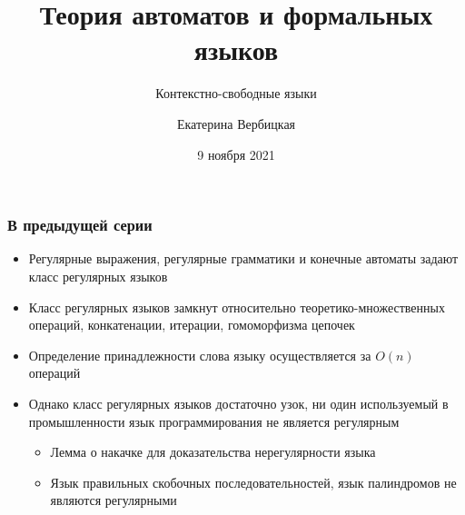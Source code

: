\documentclass{beamer}
\title[]{Теория автоматов и формальных языков}
\subtitle[]{Контекстно-свободные языки}
\institute[]{
Санкт-Петербургский государственный электротехнический университет <<ЛЭТИ>>\\
}
\author[]{Екатерина Вербицкая}
\date{9 ноября 2021}
\begin{document}
{
  \begin{frame}
    \titlepage
  \end{frame}
}


\begin{frame}[fragile]
  \transwipe[direction=90]
  \frametitle{В предыдущей серии}
  \begin{itemize}
    \item Регулярные выражения, регулярные грамматики и конечные автоматы задают класс регулярных языков
    \item Класс регулярных языков замкнут относительно теоретико-множественных операций, конкатенации, итерации, гомоморфизма цепочек
    \item Определение принадлежности слова языку осуществляется за $O(n)$ операций
    \item Однако класс регулярных языков достаточно узок, ни один используемый в промышленности язык программирования не является регулярным
    \begin{itemize}
      \item Лемма о накачке для доказательства нерегулярности языка
      \item Язык правильных скобочных последовательностей, язык палиндромов не являются регулярными
    \end{itemize}
  \end{itemize}
\end{frame}
\end{document}
